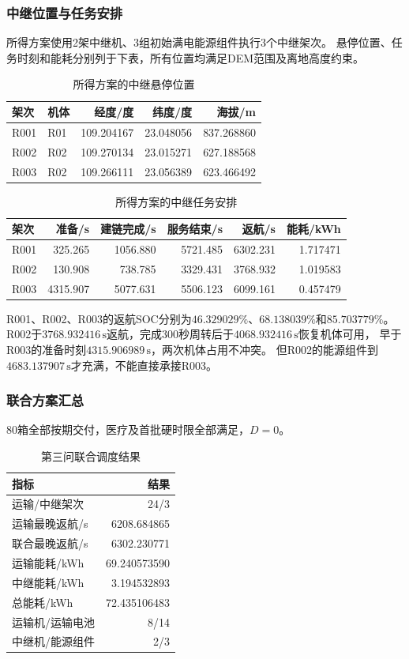 \subsubsection{中继位置与任务安排}
所得方案使用2架中继机、3组初始满电能源组件执行3个中继架次。
悬停位置、任务时刻和能耗分别列于下表，所有位置均满足DEM范围及离地高度约束。
\begin{table}[htbp]
\centering
\small
\caption{所得方案的中继悬停位置}
\label{tab:q3_locations}
\begin{tabular}{llrrr}
\toprule
架次 & 机体 & 经度/度 & 纬度/度 & 海拔/m \\
\midrule
R001 & R01 & 109.204167 & 23.048056 & 837.268860 \\
R002 & R02 & 109.270134 & 23.015271 & 627.188568 \\
R003 & R02 & 109.266111 & 23.056389 & 623.466492 \\
\bottomrule
\end{tabular}
\end{table}
\begin{table}[htbp]
\centering
\small
\caption{所得方案的中继任务安排}
\label{tab:q3_relay_schedule}
\begin{tabular}{lrrrrr}
\toprule
架次 & 准备/s & 建链完成/s & 服务结束/s & 返航/s & 能耗/kWh \\
\midrule
R001 & 325.265 & 1056.880 & 5721.485 & 6302.231 & 1.717471 \\
R002 & 130.908 & 738.785 & 3329.431 & 3768.932 & 1.019583 \\
R003 & 4315.907 & 5077.631 & 5506.123 & 6099.161 & 0.457479 \\
\bottomrule
\end{tabular}
\end{table}

R001、R002、R003的返航SOC分别为$46.329029\%$、$68.138039\%$和$85.703779\%$。
R002于$3768.932416\,\mathrm{s}$返航，完成300秒周转后于$4068.932416\,\mathrm{s}$恢复机体可用，
早于R003的准备时刻$4315.906989\,\mathrm{s}$，两次机体占用不冲突。
但R002的能源组件到$4683.137907\,\mathrm{s}$才充满，不能直接承接R003。

\subsubsection{联合方案汇总}
80箱全部按期交付，医疗及首批硬时限全部满足，$D=0$。
\begin{table}[htbp]
\centering
\small
\caption{第三问联合调度结果}
\label{tab:q3_summary}
\begin{tabular}{lr}
\toprule
指标 & 结果 \\
\midrule
运输/中继架次 & 24/3 \\
运输最晚返航/s & 6208.684865 \\
联合最晚返航/s & 6302.230771 \\
运输能耗/kWh & 69.240573590 \\
中继能耗/kWh & 3.194532893 \\
总能耗/kWh & 72.435106483 \\
运输机/运输电池 & 8/14 \\
中继机/能源组件 & 2/3 \\
\bottomrule
\end{tabular}
\end{table}

